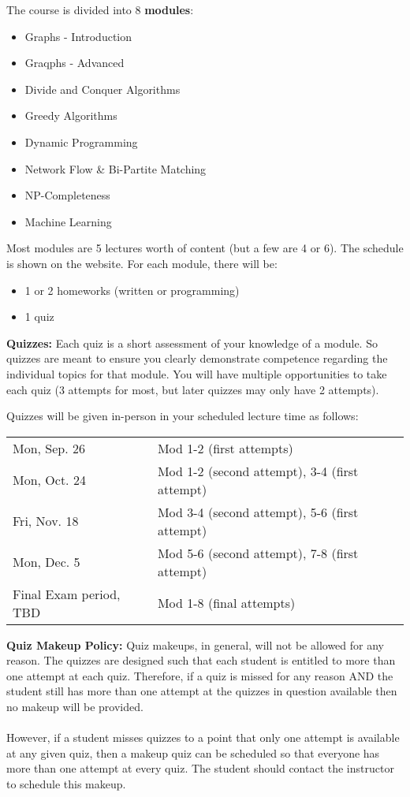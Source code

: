 \documentclass[12pt]{article}
\begin{document}
The course is divided into 8 {\bf modules}:
\begin{itemize}
    \item Graphs - Introduction
    \item Graqphs - Advanced
    \item Divide and Conquer Algorithms
    \item Greedy Algorithms
    \item Dynamic Programming
    \item Network Flow \& Bi-Partite Matching
    \item NP-Completeness
    \item Machine Learning
\end{itemize}
Most modules are 5 lectures worth of content (but a few are 4 or 6). The schedule is shown on the website. 
For each module, there will be:
\begin{itemize}
    \item 1 or 2 homeworks (written or programming)
    \item 1 quiz
\end{itemize}

\textbf{Quizzes:}  Each quiz is a short assessment of your knowledge of a module. So quizzes are meant to ensure you clearly demonstrate competence regarding the individual topics for that module.  You will have multiple opportunities to take each quiz (3 attempts for most, but later quizzes may only have 2 attempts).

Quizzes will be given in-person in your scheduled lecture time as follows:\\
\begin{tabular}{ll}
Mon, Sep. 26	&	Mod 1-2 (first attempts) \\
Mon, Oct. 24	&	Mod 1-2 (second attempt), 3-4 (first attempt) \\
Fri, Nov. 18	&	Mod 3-4 (second attempt), 5-6 (first attempt) \\
Mon, Dec. 5	    &	Mod 5-6 (second attempt), 7-8 (first attempt) \\
Final Exam period, TBD 	&	Mod 1-8 (final attempts) \\
\end{tabular}

\textbf{Quiz Makeup Policy:} Quiz makeups, in general, will not be allowed for any reason. The quizzes are designed such that each student is entitled to more than one attempt at each quiz. Therefore, if a quiz is missed for any reason AND the student still has more than one attempt at the quizzes in question available then no makeup will be provided.\\
\\
However, if a student misses quizzes to a point that only one attempt is available at any given quiz, then a makeup quiz can be scheduled so that everyone has more than one attempt at every quiz. The student should contact the instructor to schedule this makeup. 
\end{document}
